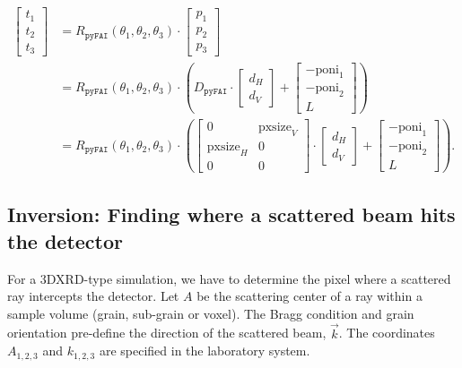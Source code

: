 \documentclass[12pt]{article}
\begin{document}
\begin{align}
  \begin{bmatrix}
    t_1 \\ t_2 \\ t_3
  \end{bmatrix}
  & =
  R_{\mathtt{pyFAI}}(\theta_1, \theta_2, \theta_3)
  \cdot
  \begin{bmatrix} p_1 \\ p_2 \\ p_3 \end{bmatrix}
  \label{eq-tpyFAI}
  \\
  & =
  R_{\mathtt{pyFAI}}(\theta_1, \theta_2, \theta_3)
  \cdot
  \left(
  D_{\mathtt{pyFAI}} \cdot \begin{bmatrix} d_H \\ d_V \end{bmatrix}
  + \begin{bmatrix} -\mathrm{poni}_1 \\ -\mathrm{poni}_2 \\ L \end{bmatrix}
  \right)
  \\
  & =
  R_{\mathtt{pyFAI}}(\theta_1, \theta_2, \theta_3)
  \cdot
  \left(
  \begin{bmatrix}
    0 & \mathrm{pxsize}_V \\
    \mathrm{pxsize}_H & 0 \\
    0 & 0
  \end{bmatrix}
  \cdot \begin{bmatrix} d_H \\ d_V \end{bmatrix}
  + \begin{bmatrix} -\mathrm{poni}_1 \\ -\mathrm{poni}_2 \\ L \end{bmatrix}
  \right).
\end{align}

\subsection{Inversion: Finding where a scattered beam hits the detector}

For a 3DXRD-type simulation, we have to determine the pixel where a
scattered ray intercepts the detector. Let $A$ be the scattering
center of a ray within a sample volume (grain, sub-grain or
voxel). The Bragg condition and grain orientation pre-define the
direction of the scattered beam, $\vec{k}$. The coordinates
$A_{1,2,3}$ and $k_{1,2,3}$ are specified in the laboratory system.
\end{document}
